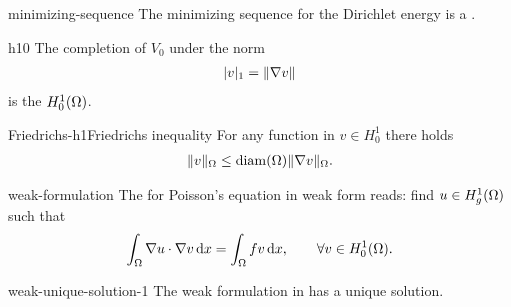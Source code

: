 \begin{Lemma}{minimizing-sequence}
  The minimizing sequence for the Dirichlet energy is a
  .
\end{Lemma}

\begin{Definition}{h10}
  The completion of $V_0$ under the norm
  \begin{gather}
    \lvert v\rvert_1 = \lVert\nabla v\rVert
  \end{gather}
  is the  $H^1_0(\Omega)$.
\end{Definition}

\begin{Lemma*}{Friedrichs-h1}{Friedrichs inequality}
  For any function in $v\in H^1_0$ there holds
  \begin{gather}
      \lVert v\rVert_{\Omega}
      \le \operatorname{diam}(\Omega) \lVert\nabla v\rVert_{\Omega}.
  \end{gather}
\end{Lemma*}

\begin{Definition}{weak-formulation}
  The  for Poisson's equation in weak form
  reads: find $u\in H^1_g(\Omega)$ such that
  \begin{gather}
    \int_{\Omega} \nabla u\cdot\nabla v \,\mathrm{d} x
    = \int_{\Omega} fv\,\mathrm{d} x, \qquad\forall v\in H^1_0(\Omega).
  \end{gather}
\end{Definition}

\begin{Theorem}{weak-unique-solution-1}
  The weak formulation in  has
  a unique solution.
\end{Theorem}



